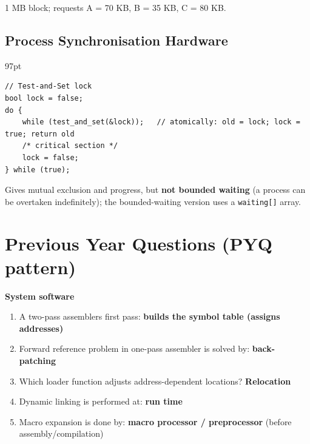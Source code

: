 1 MB block; requests A = 70 KB, B = 35 KB, C = 80 KB.



\needspace{147pt}

\hypertarget{p2-05--148-process-synchronisation-hardware}{%
\subsection{Process Synchronisation Hardware}\label{p2-05--148-process-synchronisation-hardware}}

\begin{listingblock}{97pt}
\begin{Verbatim}[fontsize=\fontsize{9.0}{10.9}\selectfont]
// Test-and-Set lock
bool lock = false;
do {
    while (test_and_set(&lock));   // atomically: old = lock; lock = true; return old
    /* critical section */
    lock = false;
} while (true);
\end{Verbatim}
\end{listingblock}

Gives mutual exclusion and progress, but \textbf{not bounded waiting} (a process can be overtaken indefinitely); the bounded-waiting version uses a \texttt{waiting{[}{]}} array.

\needspace{125pt}

\hypertarget{p2-05--previous-year-questions-pyq-pattern}{%
\section{Previous Year Questions (PYQ pattern)}\label{p2-05--previous-year-questions-pyq-pattern}}

\textbf{System software}

\begin{enumerate}
\def\labelenumi{\arabic{enumi}.}
\tightlist
\item
  A two-pass assembler\textquotesingle s first pass: \textbf{builds the symbol table (assigns addresses)}
\item
  Forward reference problem in one-pass assembler is solved by: \textbf{back-patching}
\item
  Which loader function adjusts address-dependent locations? \textbf{Relocation}
\item
  Dynamic linking is performed at: \textbf{run time}
\item
  Macro expansion is done by: \textbf{macro processor / preprocessor} (before assembly/compilation)
\end{enumerate}

